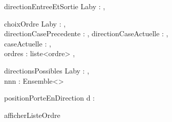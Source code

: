 \begin{algorithme}
    \signaturefonction
        {directionEntreeEtSortie}
        {Laby : {\Labyrinthe}}
        {\direction, \direction}
\end{algorithme}

\begin{algorithme}
    \signaturefonction
        {choixOrdre}
        {Laby : {\Labyrinthe}, \\ 
         directionCasePrecedente : {\direction}, directionCaseActuelle : {\direction}, \\ 
         caseActuelle : {\naturelNonNul}, \\ 
         ordres : liste<{ordre}>}
        {\direction, \direction}
\end{algorithme}

\begin{algorithme}
    \signaturefonction
        {directionsPossibles}
        {Laby : {\Labyrinthe}, \\ 
         nnn : {\naturelNonNul}}
        {Ensemble<{\direction}>}
\end{algorithme}

\begin{algorithme}
    \signaturefonction
        {positionPorteEnDirection}
        {d : {\direction}}
        {\direction}
\end{algorithme}

\begin{algorithme}
    \signatureprocedure
        {afficherListeOrdre}
        {}
\end{algorithme}
